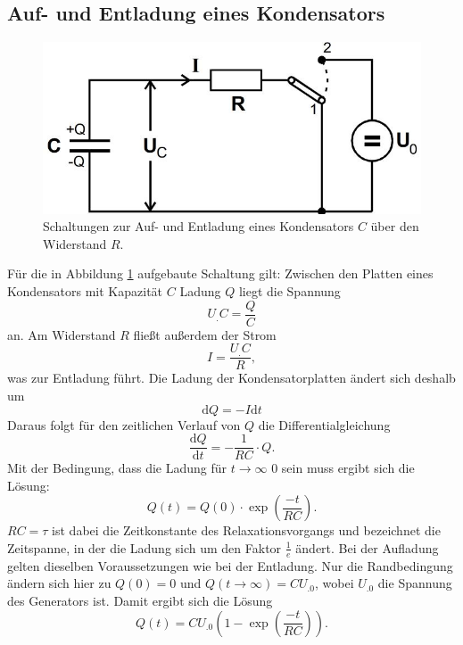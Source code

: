 \subsection{Auf- und Entladung eines Kondensators}
\label{sec:Entladung}
\begin{figure}
\centering
\includegraphics[scale=0.35]{content/images/theorie.jpg}
\caption{Schaltungen zur Auf- und Entladung eines Kondensators $C$ über den Widerstand $R$.\cite{V353}}
\label{fig:theorie}
\end{figure}
Für die in Abbildung \ref{fig:theorie} aufgebaute Schaltung gilt:
Zwischen den Platten eines Kondensators mit Kapazität $C$ Ladung $Q$  liegt die Spannung
\begin{equation}
U_.C=\frac{Q}{C}\label{eq:QC}
\end{equation}
an. Am Widerstand $R$ fließt außerdem der Strom
\begin{equation}
I = \frac{U_.C}{R},
\end{equation}
was zur Entladung führt.
Die Ladung der Kondensatorplatten ändert sich deshalb um
\begin{equation}
\mathrm{d}Q = - I\mathrm{d}t\label{eq:dQ}
\end{equation}
Daraus folgt für den zeitlichen Verlauf von $Q$ die Differentialgleichung
\begin{equation}
\frac{\mathrm{d}Q}{\mathrm{d}t} = - \frac{1}{RC}\cdot Q\text{.}
\label{eq:DGL}
\end{equation}
Mit der Bedingung, dass die Ladung für $t\rightarrow\infty$ 0 sein muss ergibt sich die Lösung:
\begin{equation}
Q(t) = Q(0)\cdot \exp\left(\frac{-t}{RC}\right) \text{.}\label{eq:Q1}
\end{equation}
$RC=\tau$ ist dabei die Zeitkonstante des Relaxationsvorgangs und bezeichnet die Zeitspanne, in der die Ladung sich um den Faktor $\frac{1}{e}$ ändert.\newline
Bei der Aufladung gelten dieselben Voraussetzungen wie bei der Entladung. Nur die Randbedingung ändern sich hier zu $Q(0)=0$ und $Q(t\rightarrow\infty)=CU_.0$, wobei $U_.0$ die Spannung des Generators ist.
Damit ergibt sich die Lösung
\begin{equation}
Q(t) = CU_.0\left(1-\exp\left(\frac{-t}{RC}\right)\right) \text{.}\label{eq:Q2}
\end{equation}

